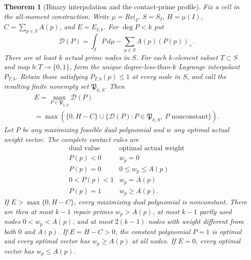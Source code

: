 \documentclass[11pt]{article}
\newtheorem{theorem}{Theorem}[section]
\theoremstyle{definition}
\begin{document}
\begin{theorem}[Binary interpolation and the contact-prime profile]
\label{thm:prime-repair-contact-profile}
Fix a cell in the all-moment construction. Write
$\mu=R\nu|_I$, $S=S_I$, $H=\mu(I)$, $C=\sum_{p\in S}A(p)$,
and $E=E_{I,k}$. For $\deg P<k$ put
\[
 \mathcal D(P)=\int_I P\,d\mu-\sum_{p\in S}A(p)(P(p))_+.
\]
There are at least $k$ actual prime nodes in $S$.
For each $k$-element subset $T\subset S$ and map
$b:T\to\{0,1\}$, form the unique degree-less-than-$k$
Lagrange interpolant $P_{T,b}$. Retain those satisfying
$P_{T,b}(p)\le1$ at every node in $S$, and call the resulting
finite nonempty set $\mathfrak P_{k,S}$. Then
\begin{equation}
 \begin{gathered}
 E=\max_{P\in\mathfrak P_{k,S}}\mathcal D(P)\\
 =\max\left(\{0,H-C\}\cup
 \{\mathcal D(P):P\in\mathfrak P_{k,S},\
                                    P\text{ nonconstant}\}\right).
 \end{gathered}
 \label{eq:binary-prime-interpolation-dual}
\end{equation}
Let $P$ be any maximizing feasible dual polynomial and $w$
any optimal actual weight vector. The complete contact rules are
\begin{equation}
 \begin{array}{c|c}
 \text{dual value}&\text{optimal actual weight}\\ \hline
 P(p)<0&w_p=0\\
 P(p)=0&0\le w_p\le A(p)\\
 0<P(p)<1&w_p=A(p)\\
 P(p)=1&w_p\ge A(p).
 \end{array}
 \label{eq:prime-repair-contact-rules}
\end{equation}
If $E>\max\{0,H-C\}$, every maximizing dual polynomial is
nonconstant. There are then at most $k-1$ repair primes
$w_p>A(p)$, at most $k-1$ partly used nodes $0<w_p<A(p)$,
and at most $2(k-1)$ nodes with weight different from both
$0$ and $A(p)$.
If $E=H-C>0$, the constant polynomial $P=1$ is optimal and
every optimal vector has $w_p\ge A(p)$ at all nodes.
If $E=0$, every optimal vector has $w_p\le A(p)$.
\end{theorem}
\end{document}
